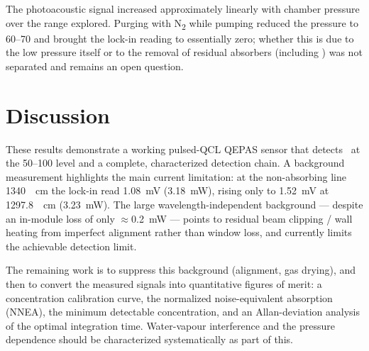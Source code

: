 The photoacoustic signal increased approximately linearly with chamber pressure
over the range explored. Purging with N\textsubscript{2} while pumping reduced
the pressure to \SIrange{60}{70}{\torr} and brought the lock-in reading to
essentially zero; whether this is due to the low pressure itself or to the
removal of residual absorbers (including \water) was not separated and remains an
open question. 

\section{Discussion}
\label{sec:discussion}

These results demonstrate a working pulsed-QCL QEPAS sensor that detects \nto\ at
the \SIrange{50}{100}{\ppm} level and a complete, characterized detection chain.
A background measurement highlights the main current limitation:
at the non-absorbing line \SI{1340}{\per\centi\meter} the lock-in read
\SI{1.08}{\milli\volt} (\SI{3.18}{\milli\watt}), rising only to
\SI{1.52}{\milli\volt} at \SI{1297.8}{\per\centi\meter} (\SI{3.23}{\milli\watt}).
The large wavelength-independent background --- despite an in-module loss of only
\(\approx\)\SI{0.2}{\milli\watt} --- points to residual beam clipping / wall
heating from imperfect alignment rather than window loss, and currently limits
the achievable detection limit.

The remaining work is to suppress this background (alignment, gas drying), and
then to convert the measured signals into quantitative figures of merit: a
concentration calibration curve, the normalized noise-equivalent absorption
(NNEA), the minimum detectable concentration, and an Allan-deviation analysis of
the optimal integration time. Water-vapour interference and the pressure
dependence should be characterized systematically as part of this.
